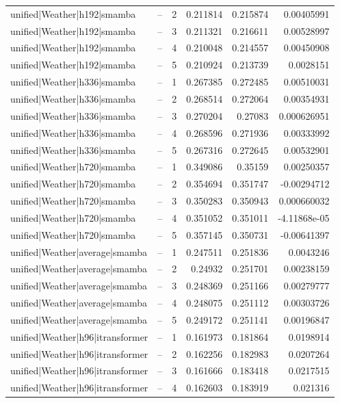 \begin{longtable}{llrrrr}
unified|Weather|h192|smamba & -- & 2 & 0.211814 & 0.215874 & 0.00405991 \\
unified|Weather|h192|smamba & -- & 3 & 0.211321 & 0.216611 & 0.00528997 \\
unified|Weather|h192|smamba & -- & 4 & 0.210048 & 0.214557 & 0.00450908 \\
unified|Weather|h192|smamba & -- & 5 & 0.210924 & 0.213739 & 0.0028151 \\
unified|Weather|h336|smamba & -- & 1 & 0.267385 & 0.272485 & 0.00510031 \\
unified|Weather|h336|smamba & -- & 2 & 0.268514 & 0.272064 & 0.00354931 \\
unified|Weather|h336|smamba & -- & 3 & 0.270204 & 0.27083 & 0.000626951 \\
unified|Weather|h336|smamba & -- & 4 & 0.268596 & 0.271936 & 0.00333992 \\
unified|Weather|h336|smamba & -- & 5 & 0.267316 & 0.272645 & 0.00532901 \\
unified|Weather|h720|smamba & -- & 1 & 0.349086 & 0.35159 & 0.00250357 \\
unified|Weather|h720|smamba & -- & 2 & 0.354694 & 0.351747 & -0.00294712 \\
unified|Weather|h720|smamba & -- & 3 & 0.350283 & 0.350943 & 0.000660032 \\
unified|Weather|h720|smamba & -- & 4 & 0.351052 & 0.351011 & -4.11868e-05 \\
unified|Weather|h720|smamba & -- & 5 & 0.357145 & 0.350731 & -0.00641397 \\
unified|Weather|average|smamba & -- & 1 & 0.247511 & 0.251836 & 0.0043246 \\
unified|Weather|average|smamba & -- & 2 & 0.24932 & 0.251701 & 0.00238159 \\
unified|Weather|average|smamba & -- & 3 & 0.248369 & 0.251166 & 0.00279777 \\
unified|Weather|average|smamba & -- & 4 & 0.248075 & 0.251112 & 0.00303726 \\
unified|Weather|average|smamba & -- & 5 & 0.249172 & 0.251141 & 0.00196847 \\
unified|Weather|h96|itransformer & -- & 1 & 0.161973 & 0.181864 & 0.0198914 \\
unified|Weather|h96|itransformer & -- & 2 & 0.162256 & 0.182983 & 0.0207264 \\
unified|Weather|h96|itransformer & -- & 3 & 0.161666 & 0.183418 & 0.0217515 \\
unified|Weather|h96|itransformer & -- & 4 & 0.162603 & 0.183919 & 0.021316 \\

\end{longtable}
